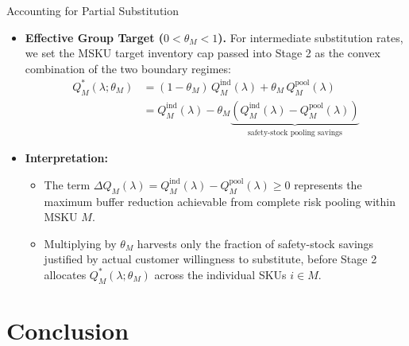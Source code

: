 \documentclass[11pt]{beamer}
\begin{document}
\begin{frame}[allowframebreaks]{Accounting for Partial Substitution}
\framebreak
\begin{small}
\begin{itemize}
\item \textbf{Effective Group Target ($0 < \theta_M < 1$).} For intermediate substitution rates, we set the MSKU target inventory cap passed into Stage 2 as the convex combination of the two boundary regimes:
\begin{align*}
Q_M^*(\lambda; \theta_M) &= (1 - \theta_M)\, Q_M^{\text{ind}}(\lambda) + \theta_M\, Q_M^{\text{pool}}(\lambda) \\[4pt]
&= Q_M^{\text{ind}}(\lambda) - \theta_M \underbrace{\left(Q_M^{\text{ind}}(\lambda) - Q_M^{\text{pool}}(\lambda)\right)}_{\text{safety-stock pooling savings}}
\end{align*}
\item \textbf{Interpretation:}
\begin{itemize}
\item The term $\Delta Q_M(\lambda) = Q_M^{\text{ind}}(\lambda) - Q_M^{\text{pool}}(\lambda) \geq 0$ represents the maximum buffer reduction achievable from complete risk pooling within MSKU $M$.
\item Multiplying by $\theta_M$ harvests only the fraction of safety-stock savings justified by actual customer willingness to substitute, before Stage 2 allocates $Q_M^*(\lambda; \theta_M)$ across the individual SKUs $i \in M$.
\end{itemize}
\end{itemize}
\end{small}
\end{frame}

\section{Conclusion}
\end{document}
